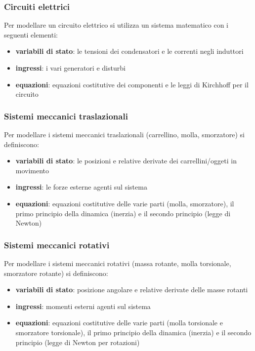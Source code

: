 \subsubsection*{Circuiti elettrici}
Per modellare un circuito elettrico si utilizza un sistema matematico con i seguenti elementi:
\begin{itemize}
	\item \textbf{variabili di stato}: le tensioni dei condensatori e le correnti negli induttori
	\item \textbf{ingressi}: i vari generatori e disturbi
	\item \textbf{equazioni}: equazioni costitutive dei componenti e le leggi di Kirchhoff per il circuito
\end{itemize}

\subsubsection*{Sistemi meccanici traslazionali}
Per modellare i sistemi meccanici traslazionali (carrellino, molla, smorzatore) si definiscono:
\begin{itemize}
	\item \textbf{variabili di stato}: le posizioni e relative derivate dei carrellini/oggeti in movimento
	\item \textbf{ingressi}: le forze esterne agenti sul sistema
	\item \textbf{equazioni}: equazioni costitutive delle varie parti (molla, smorzatore), il primo principio della dinamica
	(inerzia) e il secondo principio (legge di Newton)
\end{itemize}

\subsubsection*{Sistemi meccanici rotativi}
Per modellare i sistemi meccanici rotativi (massa rotante, molla torsionale, smorzatore rotante) si definiscono:
\begin{itemize}
	\item \textbf{variabili di stato}: posizione angolare e relative derivate delle masse rotanti
	\item \textbf{ingressi}: momenti esterni agenti sul sistema
	\item \textbf{equazioni}: equazioni costitutive delle varie parti (molla torsionale e smorzatore torsionale), il primo
	principio della dinamica (inerzia) e il secondo principio (legge di Newton per rotazioni)
\end{itemize}

